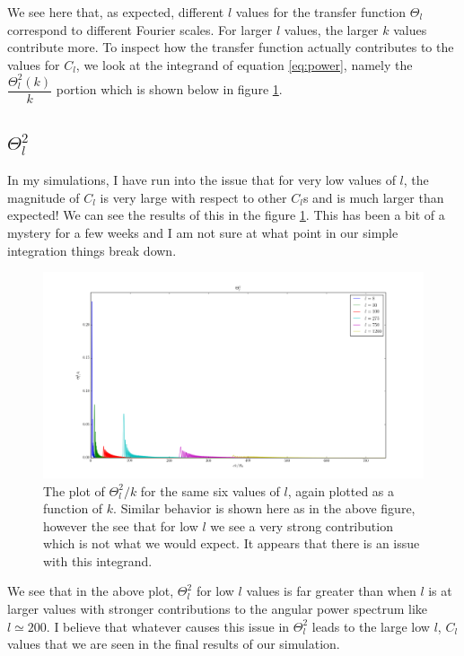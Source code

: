 \documentclass[a4paper]{article}
\begin{document}
We see here that, as expected, different $l$ values for the transfer function $\Theta_l$ correspond to different Fourier scales. For larger $l$ values, the larger $k$ values contribute more. To inspect how the transfer function actually contributes to the values for $C_l$, we look at the integrand of equation \ref{eq:power}, namely the $ \dfrac{\Theta_l^2(k)}{k}$ portion which is shown below in figure \ref{fig:theta2}.\\

\subsection{$\Theta_l^2$}
In my simulations, I have run into the issue that for very low values of $l$, the magnitude of $C_l$ is very large with respect to other $C_l$s and is much larger than expected! We can see the results of this in the figure \ref{fig:theta2}. This has been a bit of a mystery for a few weeks and I am not sure at what point in our simple integration things break down. 

\begin{figure}[ht]\label{fig:theta2}
\centering
\includegraphics[width=\linewidth]{theta_squared}
\caption{The plot of $\Theta_l^2/k$ for the same six values of $l$, again plotted as a function of $k$. Similar behavior is shown here as in the above figure, however the see that for low $l$ we see a very strong contribution which is not what we would expect. It appears that there is an issue with this integrand.}
\end{figure}

We see that in the above plot, $\Theta_l^2$ for low $l$ values is far greater than when $l$ is at larger values with stronger contributions to the angular power spectrum like $l \simeq 200$. I believe that whatever causes this issue in $\Theta_l^2$ leads to the large low $l$, $C_l$ values that we are seen in the final results of our simulation.
\end{document}

